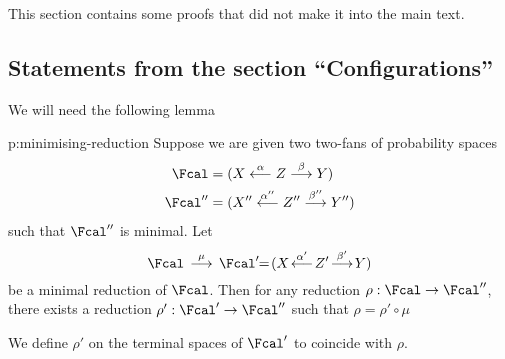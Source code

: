 \let\thesubsectionstandard=\thesubsection
This section contains some proofs that did not make it into the
  main text.

\def\thesubsection{\thesection.\ref{s:config}}
\subsection{Statements from the section ``Configurations''}

\begin{Proof}
  We will need the following lemma
  \begin{tlemma}{p:minimising-reduction}
    Suppose we are given two two-fans of probability spaces
    \begin{align*}
      \Fcal
      &=
      (X\oot[\alpha]Z\too[\beta]Y)\\
      \Fcal''
      &=
      (X''\oot[\alpha''] Z''\too[\beta''] Y'')
    \end{align*}
    such that $\Fcal''$ is minimal. Let
    \[
    \Fcal\,\too[\mu]\,\Fcal'\!\!=\!(X\!\oot[\alpha']\! Z'\!\too[\beta']\! Y)
    \]
    be a minimal reduction of
    $\Fcal$. Then for any reduction $\rho:\Fcal\to\Fcal''$, there exists
    a reduction $\rho':\Fcal'\to\Fcal''$ such that $\rho=\rho'\circ \mu$
  \end{tlemma}
  \begin{Proof}
  	We define $\rho'$ on the terminal spaces of $\Fcal'$ to coincide with $\rho$.
   

\end{Proof}
\end{Proof}
